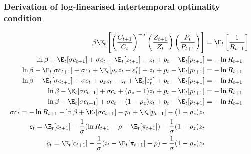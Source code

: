\subsubsection{Derivation of log-linearised intertemporal optimality condition}
\begin{align}\label{eq:appendix_intertemporal_loglinear_start}
    \beta\E_t\left[\left(\frac{C_{t+1}}{C_{t}}\right)^{-\sigma} \left(\frac{Z_{t+1}}{Z_t}\right) \left(\frac{P_{t}}{ P_{t+1}}\right)\right]                 &= \E_t \left[\frac{1}{R_{t+1}}\right] \\
    \ln\beta - \E_t[\sigma c_{t+1}] + \sigma c_t + \E_t[z_{t+1}] - z_t + p_t - \E_t [p_{t+1}] &= -\ln R_{t+1}                                                \\
    \ln\beta - \E_t[\sigma c_{t+1}] + \sigma c_t + \E_t[\rho_z z_t + \varepsilon^z_t] - z_t + p_t - \E_t [p_{t+1}] &= -\ln R_{t+1}                                                \\
    \ln\beta - \E_t[\sigma c_{t+1}] + \sigma c_t + \rho_z z_t - z_t + \E_t[\varepsilon^z_t] + p_t - \E_t [p_{t+1}] &= -\ln R_{t+1}                                                \\
    \ln\beta - \E_t[\sigma c_{t+1}] + \sigma c_t + (\rho_z-1)z_t + p_t - \E_t [p_{t+1}] &= -\ln R_{t+1}                                                \\
    \ln\beta - \E_t[\sigma c_{t+1}] + \sigma c_t - (1-\rho_z)z_t + p_t - \E_t [p_{t+1}] &= -\ln R_{t+1}                                                \\
    \sigma c_t  = -\ln R_{t+1} - \ln \beta + \E_t[\sigma c_{t+1}] - p_t + \E_t [p_{t+1}] - (1-\rho_z)z_t                                   \\
    c_t =  \E_t[c_{t+1}] - \frac{1}{\sigma}( \ln R_{t+1} - \rho - \E_t [\pi_{t+1}]   )   - \frac{1}{\sigma}(1-\rho_z)z_t                                            \\
    c_t =  \E_t[c_{t+1}] - \frac{1}{\sigma}( i_t  - \E_t [\pi_{t+1}] - \rho  )         - \frac{1}{\sigma}(1-\rho_z)z_t    
    \label{eq:appendix_intertemporal_loglinear_end}                                                       
\end{align}
\newpage